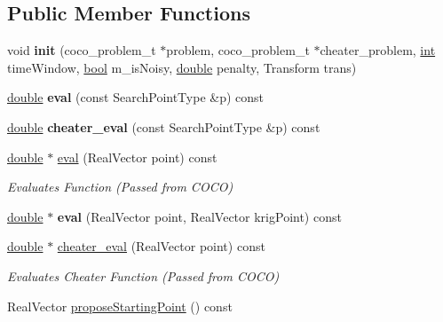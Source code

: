 \subsection*{Public Member Functions}
\begin{DoxyCompactItemize}
\item 
void {\bfseries init} (coco\+\_\+problem\+\_\+t $\ast$problem, coco\+\_\+problem\+\_\+t $\ast$cheater\+\_\+problem, \hyperlink{classint}{int} time\+Window, \hyperlink{classbool}{bool} m\+\_\+is\+Noisy, \hyperlink{classdouble}{double} penalty, Transform trans)\hypertarget{classCOCOfunc__s_ae19f752fc3252bb7192d880198677e4d}{}\label{classCOCOfunc__s_ae19f752fc3252bb7192d880198677e4d}

\item 
\hyperlink{classdouble}{double} {\bfseries eval} (const Search\+Point\+Type \&p) const \hypertarget{classCOCOfunc__s_ac618cc8d7197030b5fdcec37e1a3a692}{}\label{classCOCOfunc__s_ac618cc8d7197030b5fdcec37e1a3a692}

\item 
\hyperlink{classdouble}{double} {\bfseries cheater\+\_\+eval} (const Search\+Point\+Type \&p) const \hypertarget{classCOCOfunc__s_a02f7b4ae9debf9fc8e87fb04f4e28a1d}{}\label{classCOCOfunc__s_a02f7b4ae9debf9fc8e87fb04f4e28a1d}

\item 
\hyperlink{classdouble}{double} $\ast$ \hyperlink{classCOCOfunc_af59cef4f0a78c07c4910bf015363c3f5}{eval} (Real\+Vector point) const
\begin{DoxyCompactList}\small\item\em Evaluates Function (Passed from C\+O\+CO) \end{DoxyCompactList}\item 
\hyperlink{classdouble}{double} $\ast$ {\bfseries eval} (Real\+Vector point, Real\+Vector krig\+Point) const\hypertarget{classCOCOfunc_a5212e78af436dfe41259bf21217cb80b}{}\label{classCOCOfunc_a5212e78af436dfe41259bf21217cb80b}

\item 
\hyperlink{classdouble}{double} $\ast$ \hyperlink{classCOCOfunc_aaf37b734aed084757a8ccf5ad4d66705}{cheater\+\_\+eval} (Real\+Vector point) const
\begin{DoxyCompactList}\small\item\em Evaluates Cheater Function (Passed from C\+O\+CO) \end{DoxyCompactList}\item 
Real\+Vector \hyperlink{classCOCOfunc_a2a5d8bccb6235159b8f28be24c989d07}{propose\+Starting\+Point} () const\hypertarget{classCOCOfunc_a2a5d8bccb6235159b8f28be24c989d07}{}\label{classCOCOfunc_a2a5d8bccb6235159b8f28be24c989d07}


\end{DoxyCompactItemize}
